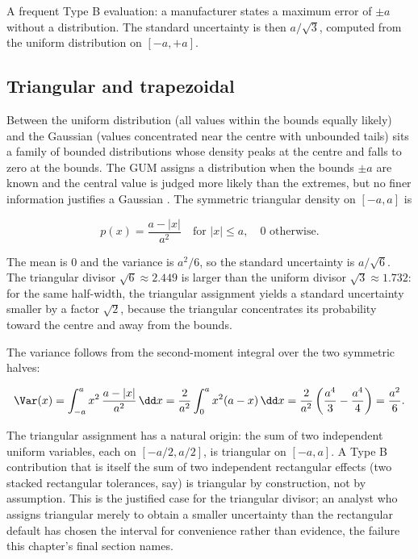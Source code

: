 A frequent Type B evaluation: a manufacturer states a maximum error
of $\pm a$ without a distribution. The standard uncertainty is then
$a/\sqrt{3}$, computed from the uniform distribution on
$[-a, +a]$.

\subsection{Triangular and trapezoidal}

Between the uniform distribution (all values within the bounds
equally likely) and the Gaussian (values concentrated near the
centre with unbounded tails) sits a family of bounded distributions
whose density peaks at the centre and falls to zero at the bounds.
The GUM assigns a  distribution when the bounds
$\pm a$ are known and the central value is judged more likely than
the extremes, but no finer information justifies a Gaussian
\cite{std:iso-iec-guide98}. The symmetric triangular density on
$[-a, a]$ is

\[
p(x) = \frac{a - |x|}{a^{2}} \quad \text{for } |x| \leq a, \quad 0
\text{ otherwise}.
\]

The mean is $0$ and the variance is $a^{2}/6$, so the standard
uncertainty is $a/\sqrt{6}$. The triangular divisor $\sqrt{6}
\approx 2.449$ is larger than the uniform divisor $\sqrt{3} \approx
1.732$: for the same half-width, the triangular assignment yields a
standard uncertainty smaller by a factor $\sqrt{2}$, because the
triangular concentrates its probability toward the centre and away
from the bounds.

The variance follows from the second-moment integral over the two
symmetric halves:

\[
\Var(x) = \int_{-a}^{a} x^{2}\,\frac{a - |x|}{a^{2}}\,\dd x
= \frac{2}{a^{2}} \int_{0}^{a} x^{2}(a - x)\,\dd x
= \frac{2}{a^{2}} \left(\frac{a^{4}}{3} - \frac{a^{4}}{4}\right)
= \frac{a^{2}}{6}.
\]

The triangular assignment has a natural origin: the sum of two
independent uniform variables, each on $[-a/2, a/2]$, is triangular
on $[-a, a]$. A Type B contribution that is itself the sum of two
independent rectangular effects (two stacked rectangular tolerances,
say) is triangular by construction, not by assumption. This is the
justified case for the triangular divisor; an analyst who assigns
triangular merely to obtain a smaller uncertainty than the
rectangular default has chosen the interval for convenience rather
than evidence, the failure this chapter's final section names.

